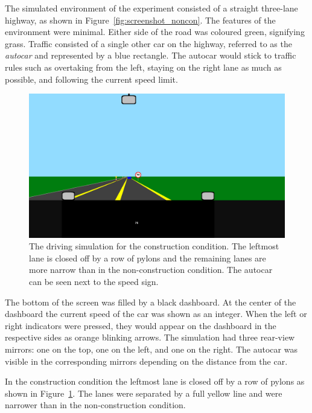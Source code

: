 The simulated environment of the experiment consisted of a straight three-lane highway, as shown in Figure~\ref{fig:screenshot_noncon}.
The features of the environment were minimal. 
Either side of the road was coloured green, signifying grass. 
Traffic consisted of a single other car on the highway, referred to as the \textit{autocar} and represented by a blue rectangle.
The autocar would stick to traffic rules such as overtaking from the left, staying on the right lane as much as possible, and following the current speed limit. 

\renewcommand{\thefigure}{2.2}
\begin{figure}
  \centering
  \includegraphics[width=\textwidth]{images/screenshot_con.pdf}
  \caption{The driving simulation for the construction condition. 
  The leftmost lane is closed off by a row of pylons and the remaining lanes are more narrow than in the non-construction condition. 
  The autocar can be seen next to the speed sign.}
  \label{fig:screenshot_con}
\end{figure}

The bottom of the screen was filled by a black dashboard. 
At the center of the dashboard the current speed of the car was shown as an integer.
When the left or right indicators were pressed, they would appear on the dashboard in the respective sides as orange blinking arrows. 
The simulation had three rear-view mirrors: one on the top, one on the left, and one on the right. 
The autocar was visible in the corresponding mirrors depending on the distance from the car. 

In the construction condition the leftmost lane is closed off by a row of pylons as shown in Figure~\ref{fig:screenshot_con}. 
The lanes were separated by a full yellow line and were narrower than in the non-construction condition. 

